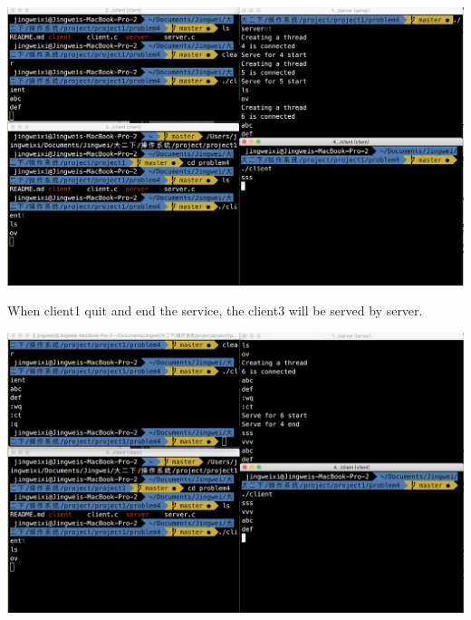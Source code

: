 \documentclass[a4paper,oneside,12pt]{article}
\begin{document}
\includegraphics[scale=0.3]{1.png}

When client1 quit and end the service, the client3 will be served by server.

\includegraphics[scale=0.3]{2.png}
\end{document}
